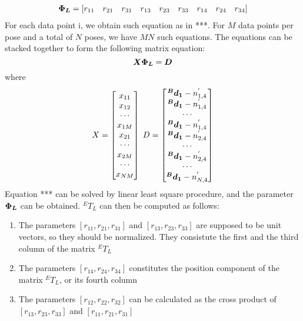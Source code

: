 \begin{multline}
  \vb*{\Phi_L} = \left[r_{11} \quad r_{21} \quad r_{31} \quad r_{13} \quad r_{23} \quad r_{33} \quad r_{14} \quad r_{24}  \quad r_{34} \right] 
\end{multline}
For each data point i, we obtain such equation as in ***. For $M$ data points per pose and a total of $N$ poses, we have $MN$ such equations. The equations can be stacked together to form the following matrix equation:
\begin{equation}
  \vb*{X}   \vb*{\Phi_L} = \vb*{D}
\end{equation}
where 
\begin{equation}
X =\begin{bmatrix}
x_{11} \\ x_{12} \\ \cdots\\x_{1M}\\ x_{21}\\ \cdots\\ x_{2M} \\ \cdots \\ x_{NM}
\end{bmatrix} \; D =\begin{bmatrix}
\vb*{{^B}d_1} -  n^{'}_{1,4} \\ \vb*{{^B}d_1} -  n^{'}_{1,4}  \\ \cdots\\ \vb*{{^B}d_1} -  n^{'}_{1,4}  \\ \vb*{{^B}d_1} -  n^{'}_{2,4} \\ \cdots\\ \vb*{{^B}d_1} -  n^{'}_{2,4}  \\ \cdots \\\vb*{{^B}d_1} -  n^{'}_{N,4} 
\end{bmatrix}
\end{equation}
Equation *** can be solved by linear least square procedure, and the parameter  $\vb*{\Phi_L}$ can be obtained. ${^E}T_L$ can then be computed as follows:
\begin{enumerate}
\item The parameters $[r_{11}, r_{21}, r_{31}]$ and $[r_{13}, r_{23}, r_{33}]$ are supposed to be unit vectors, so they should be normalized. They consistute the first and the third column of the matrix ${^E}T_L$
\item The parameters $[r_{14}, r_{24}, r_{34}]$ constitutes the position component of the matrix ${^E}T_L$, or its fourth column
\item The parameters $[r_{12}, r_{22}, r_{32}]$ can be calculated as the cross product of  $[r_{13}, r_{23}, r_{33}]$ and $[r_{11}, r_{21}, r_{31}]$ 
\end{enumerate}

